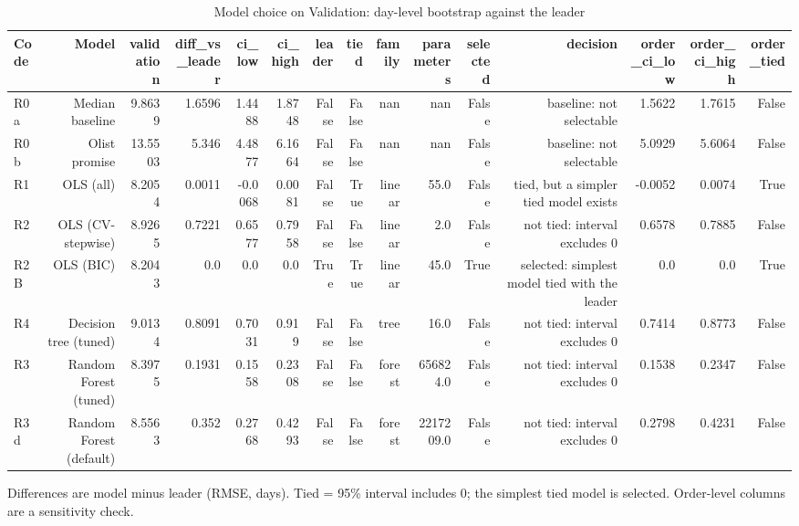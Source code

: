 \begin{table}[htbp]
\centering
\small
\caption{Model choice on Validation: day-level bootstrap against the leader}
\begin{tabular}{lrrrrrrrrrrrrrr}
\toprule
Code & Model & validation & diff\_vs\_leader & ci\_low & ci\_high & leader & tied & family & parameters & selected & decision & order\_ci\_low & order\_ci\_high & order\_tied \\
\midrule
R0a & Median baseline & 9.8639 & 1.6596 & 1.4488 & 1.8748 & False & False & nan & nan & False & baseline: not selectable & 1.5622 & 1.7615 & False \\
R0b & Olist promise & 13.5503 & 5.346 & 4.4877 & 6.1664 & False & False & nan & nan & False & baseline: not selectable & 5.0929 & 5.6064 & False \\
R1 & OLS (all) & 8.2054 & 0.0011 & -0.0068 & 0.0081 & False & True & linear & 55.0 & False & tied, but a simpler tied model exists & -0.0052 & 0.0074 & True \\
R2 & OLS (CV-stepwise) & 8.9265 & 0.7221 & 0.6577 & 0.7958 & False & False & linear & 2.0 & False & not tied: interval excludes 0 & 0.6578 & 0.7885 & False \\
R2B & OLS (BIC) & 8.2043 & 0.0 & 0.0 & 0.0 & True & True & linear & 45.0 & True & selected: simplest model tied with the leader & 0.0 & 0.0 & True \\
R4 & Decision tree (tuned) & 9.0134 & 0.8091 & 0.7031 & 0.919 & False & False & tree & 16.0 & False & not tied: interval excludes 0 & 0.7414 & 0.8773 & False \\
R3 & Random Forest (tuned) & 8.3975 & 0.1931 & 0.1558 & 0.2308 & False & False & forest & 656824.0 & False & not tied: interval excludes 0 & 0.1538 & 0.2347 & False \\
R3d & Random Forest (default) & 8.5563 & 0.352 & 0.2768 & 0.4293 & False & False & forest & 2217209.0 & False & not tied: interval excludes 0 & 0.2798 & 0.4231 & False \\
\bottomrule
\end{tabular}
\par\smallskip\begin{minipage}{\linewidth}\footnotesize Differences are model minus leader (RMSE, days). Tied = 95\% interval includes 0; the simplest tied model is selected. Order-level columns are a sensitivity check.\end{minipage}
\end{table}

